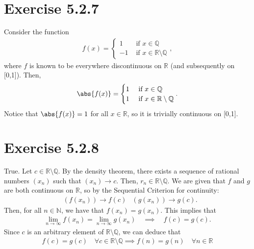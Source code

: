 \documentclass[11pt]{article}
\newcommand{\N}{\mathbb{N}}  %
\newcommand{\bbR}{\mathbb{R}}  %
\newcommand{\Q}{\mathbb{Q}}  %
\begin{document}
\section*{Exercise 5.2.7}\vspace{-1em}
    Consider the function
    \begin{align}
        f(x)=\begin{cases}
            1 & \text{ if } x\in\Q \\
            -1 & \text{ if } x\in\bbR\setminus\Q
        \end{cases},
    \end{align}
    where $f$ is known to be everywhere discontinuous on $\bbR$ (and subsequently on [0,1]). Then,
    \begin{align}
        \abs{f(x)}=\begin{cases}
            1 & \text{ if } x\in\Q \\
            1 & \text{ if } x\in\bbR\setminus\Q
        \end{cases}.
    \end{align}
    Notice that $\abs{f(x)}=1$ for all $x\in\bbR$, so it is trivially continuous on [0,1].
    \vspace{-1em}

\section*{Exercise 5.2.8}\vspace{-1em}
    True. Let $c\in\bbR\setminus\Q$. By the density theorem, there exists a sequence of rational numbers $(x_n)$ such that $(x_n)\to c$. Then, $r_n\in\bbR\setminus\Q$. We are given that $f$ and $g$ are both continuous on $\bbR$, so by the Sequential Criterion for continuity:
    \begin{align} &(f(x_n))\to f(c) &(g(x_n))\to g(c).\end{align}
    Then, for all $n\in\N$, we have that $f(x_n)=g(x_n)$. This implies that
    \begin{align} \lim_{n\to\infty}f(x_n) = \lim_{n\to\infty}g(x_n) \quad\implies\quad f(c)=g(c). \end{align}
    Since $c$ is an arbitrary element of $\bbR\setminus\Q$, we can deduce that
    \begin{align} f(c)=g(c) \quad \forall c\in\bbR\setminus\Q\implies f(n)=g(n) \quad \forall n\in\bbR \end{align}
    \vspace{-1em}
\end{document}
